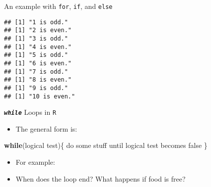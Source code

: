 \documentclass[ignorenonframetext,]{beamer}
\newenvironment{Shaded}{\begin{snugshade}}{\end{snugshade}}
\newcommand{\KeywordTok}[1]{\textcolor[rgb]{0.13,0.29,0.53}{\textbf{#1}}}
\newcommand{\DecValTok}[1]{\textcolor[rgb]{0.00,0.00,0.81}{#1}}
\newcommand{\StringTok}[1]{\textcolor[rgb]{0.31,0.60,0.02}{#1}}
\newcommand{\ControlFlowTok}[1]{\textcolor[rgb]{0.13,0.29,0.53}{\textbf{#1}}}
\newcommand{\OperatorTok}[1]{\textcolor[rgb]{0.81,0.36,0.00}{\textbf{#1}}}
\newcommand{\ErrorTok}[1]{\textcolor[rgb]{0.64,0.00,0.00}{\textbf{#1}}}
\newcommand{\NormalTok}[1]{#1}
\providecommand{\tightlist}{%
	\setlength{\itemsep}{0pt}\setlength{\parskip}{0pt}}
\begin{document}
\begin{frame}[fragile]{An example with \texttt{for}, \texttt{if}, and
\texttt{else}}

\begin{Shaded}
\end{Shaded}

\begin{verbatim}
## [1] "1 is odd."
## [1] "2 is even."
## [1] "3 is odd."
## [1] "4 is even."
## [1] "5 is odd."
## [1] "6 is even."
## [1] "7 is odd."
## [1] "8 is even."
## [1] "9 is odd."
## [1] "10 is even."
\end{verbatim}

\end{frame}

\begin{frame}[fragile]{\textbf{\emph{\texttt{while}}} Loops in
\texttt{R}}

\begin{itemize}
\tightlist
\item
  The general form is:
\end{itemize}

\begin{Shaded}
\begin{Highlighting}[]
\ControlFlowTok{while}\NormalTok{(logical test)\{}
\NormalTok{  do some stuff until logical test becomes false}
\NormalTok{\} }
\end{Highlighting}
\end{Shaded}

\begin{itemize}
\tightlist
\item
  For example:
\end{itemize}

\begin{Shaded}
\end{Shaded}

\begin{itemize}
\tightlist
\item
  When does the loop end? What happens if food is free?
\end{itemize}

\end{frame}
\end{document}

